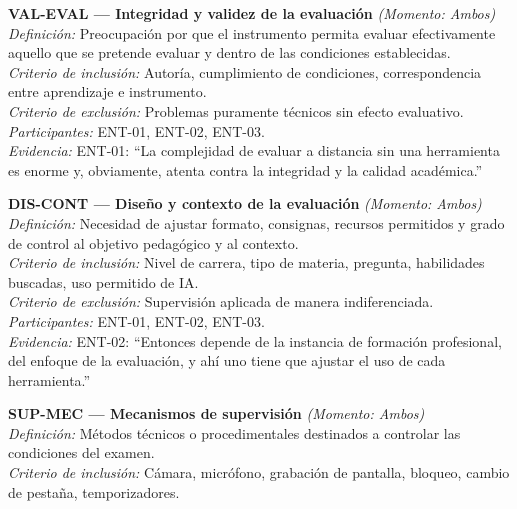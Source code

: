 \begin{center}\footnotesize
\begin{infobox}
\textbf{\textcolor{accent}{VAL-EVAL --- Integridad y validez de la evaluación}} \textit{(Momento: Ambos)}\\
\textit{Definición:} Preocupación por que el instrumento permita evaluar efectivamente aquello que se pretende evaluar y dentro de las condiciones establecidas.\\
\textit{Criterio de inclusión:} Autoría, cumplimiento de condiciones, correspondencia entre aprendizaje e instrumento.\\
\textit{Criterio de exclusión:} Problemas puramente técnicos sin efecto evaluativo.\\
\textit{Participantes:} ENT-01, ENT-02, ENT-03.\\
\textit{Evidencia:} ENT-01: ``La complejidad de evaluar a distancia sin una herramienta es enorme y, obviamente, atenta contra la integridad y la calidad académica.''
\end{infobox}
\vspace{2pt}
\begin{infobox}
\textbf{\textcolor{accent}{DIS-CONT --- Diseño y contexto de la evaluación}} \textit{(Momento: Ambos)}\\
\textit{Definición:} Necesidad de ajustar formato, consignas, recursos permitidos y grado de control al objetivo pedagógico y al contexto.\\
\textit{Criterio de inclusión:} Nivel de carrera, tipo de materia, pregunta, habilidades buscadas, uso permitido de IA.\\
\textit{Criterio de exclusión:} Supervisión aplicada de manera indiferenciada.\\
\textit{Participantes:} ENT-01, ENT-02, ENT-03.\\
\textit{Evidencia:} ENT-02: ``Entonces depende de la instancia de formación profesional, del enfoque de la evaluación, y ahí uno tiene que ajustar el uso de cada herramienta.''
\end{infobox}
\vspace{2pt}
\begin{infobox}
\textbf{\textcolor{accent}{SUP-MEC --- Mecanismos de supervisión}} \textit{(Momento: Ambos)}\\
\textit{Definición:} Métodos técnicos o procedimentales destinados a controlar las condiciones del examen.\\
\textit{Criterio de inclusión:} Cámara, micrófono, grabación de pantalla, bloqueo, cambio de pestaña, temporizadores.\\

\end{infobox}
\end{center}
